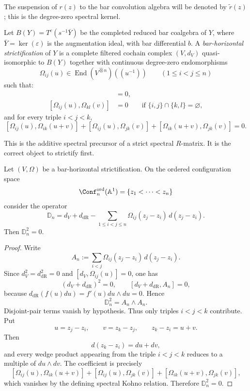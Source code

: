 The suspension of $r(z)$ to the bar convolution algebra will be denoted
by $\widetilde r(z)$; this is the degree-zero spectral kernel.

\begin{definition}
Let $B(Y)=T^c(s^{-1}\bar{Y})$ be the completed reduced bar coalgebra of $Y$,
where $\bar{Y} = \ker(\varepsilon)$ is the augmentation ideal, with
bar differential $b$. A \emph{bar-horizontal strictification} of $Y$
is a complete filtered cochain complex $(V,d_V)$ quasi-isomorphic to
$B(Y)$ together with continuous degree-zero endomorphisms
\[
\Omega_{ij}(u)\in \operatorname{End}(V^{\widehat\otimes n})((u^{-1}))
\qquad (1\le i<j\le n)
\]
such that:
\begin{align*}
[d_V,\Omega_{ij}(u)]&=0,\\
[\Omega_{ij}(u),\Omega_{kl}(v)]&=0
\qquad \text{if }\{i,j\}\cap\{k,l\}=\varnothing,
\end{align*}
and for every triple $i<j<k$,
\[
[\Omega_{ij}(u),\Omega_{ik}(u+v)]
+[\Omega_{ij}(u),\Omega_{jk}(v)]
+[\Omega_{ik}(u+v),\Omega_{jk}(v)] = 0.
\]
\end{definition}

This is the additive spectral precursor of a strict spectral
$R$-matrix. It is the correct object to strictify first.

\begin{theorem}
\ClaimStatusProvedHere
\label{thm:derived-additive-kz}
Let $(V,\Omega)$ be a bar-horizontal strictification. On the ordered
configuration space
\[
\Conf_n^{\mathrm{ord}}(\mathbb A^1)=\{z_1<\cdots<z_n\}
\]
consider the operator
\[
\mathbb D_n
=
 d_V+d_{\mathrm{dR}}
 - \sum_{1\le i<j\le n}\Omega_{ij}(z_j-z_i)\,d(z_j-z_i).
\]
Then $\mathbb D_n^2=0$.
\end{theorem}

\begin{proof}
Write
\[
A_n:=\sum_{i<j}\Omega_{ij}(z_j-z_i)\,d(z_j-z_i).
\]
Since $d_V^2=d_{\mathrm{dR}}^2=0$ and $[d_V,\Omega_{ij}(u)]=0$, one has
\[
(d_V+d_{\mathrm{dR}})^2=0,
\qquad
[d_V+d_{\mathrm{dR}},A_n]=0,
\]
because $d_{\mathrm{dR}}(f(u)du)=f'(u)du\wedge du=0$.
Hence
\[
\mathbb D_n^2=A_n\wedge A_n.
\]
Disjoint-pair terms vanish by hypothesis. Thus only triples
$i<j<k$ contribute. Put
\[
u=z_j-z_i,
\qquad
v=z_k-z_j,
\qquad
z_k-z_i=u+v.
\]
Then
\[
d(z_k-z_i)=du+dv,
\]
and every wedge product appearing from the triple $i<j<k$ reduces to a
multiple of $du\wedge dv$. The coefficient is precisely
\[
[\Omega_{ij}(u),\Omega_{ik}(u+v)]
+[\Omega_{ij}(u),\Omega_{jk}(v)]
+[\Omega_{ik}(u+v),\Omega_{jk}(v)],
\]
which vanishes by the defining spectral Kohno relation. Therefore
$\mathbb D_n^2=0$.
\end{proof}

